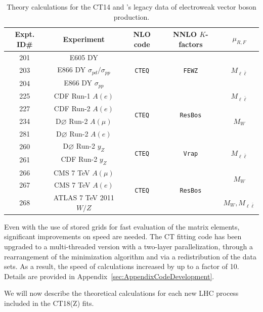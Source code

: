 \begin{table}[tb]
\begin{tabular}{|c|c|c|c|c| }
\hline
Expt. ID\# & Experiment   &  NLO code &  NNLO $K$-factors  & $\mu_{R,F}$\\
\hline
201 &  E605 DY  &  \multirow{3}{*}{ \texttt{CTEQ}}  & \multirow{3}{*}{ \texttt{FEWZ}  }   & \multirow{3}{*}{$M_{\ell \bar \ell}$} \\
203  & E866 DY $\sigma_{pd}/\sigma_{pp}$  &  &    & \\
204  & E866 DY $\sigma_{pp}$  &  &    & \\
\hline
225 & CDF Run-1 $A(e)$  &  \multirow{4}{*}{ \texttt{CTEQ}}  &  \multirow{4}{*}{ \texttt{ResBos}}  &  $M_{\ell \bar \ell}$   \\
227 & CDF Run-2 $A(e)$ &     &  &  \multirow{3}{*}{$M_{W}$} \\
234 &  D$\varnothing$ Run-2 $A(\mu)$  &    && \\
281 & D$\varnothing$ Run-2 $A(e)$  &   &&  \\
\hline
260 &   D$\varnothing$ Run-2 $y_{Z}$ &   \multirow{2}{*}{ \texttt{CTEQ}}  &  \multirow{2}{*}{\texttt{Vrap}}  &
\multirow{2}{*}{ $M_{\ell \bar \ell}$ } \\
261 &  CDF Run-2 $y_{Z}$ &        &  &\\
\hline 
266 & CMS 7 TeV $A(\mu)$   &   \multirow{3}{*}{\texttt{CTEQ} }  &\multirow{3}{*}{ \texttt{ResBos}} & \multirow{2}{*}{ $M_{W}$}   \\
267  & CMS 7 TeV $A(e)$  &        &  &\\
268 &  ATLAS 7 TeV 2011 $W/Z$  &   &   & $M_{W},M_{\ell \bar \ell}$ \\
\hline
\end{tabular}
\caption{Theory calculations for the CT14 and \CTHERAII's legacy data of electroweak vector boson production.
\label{Theory-Calc-VB}}
\end{table}

Even with the use of stored grids for fast evaluation of the matrix
elements, significant improvements on speed are needed. The CT fitting
code has been upgraded to a multi-threaded version with a two-layer
parallelization, through a rearrangement of the minimization
algorithm and via a redistribution of the data sets. As a result, the speed of calculations increased by up to a factor of 10. Details are provided in
Appendix~\ref{sec:AppendixCodeDevelopment}.  

We will now describe the theoretical calculations for each new LHC process included in the CT18(Z) fits.

